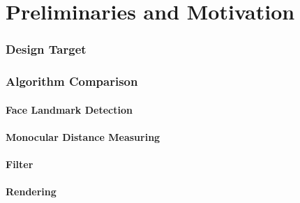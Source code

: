 \part{Preliminaries and Motivation}
\section{Design Target}

\section{Algorithm Comparison}

\subsection{Face  Landmark Detection}

\subsection{Monocular Distance Measuring}

\subsection{Filter}

\subsection{Rendering}